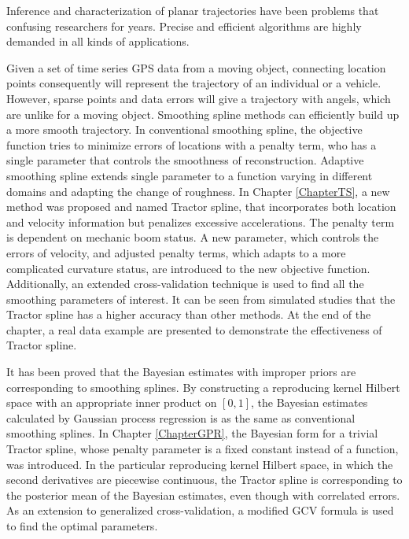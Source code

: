 
Inference and characterization of planar trajectories have been problems that confusing researchers for years. Precise and efficient algorithms are highly demanded in all kinds of applications. 

Given a set of time series GPS data from a moving object, connecting location points consequently will represent the trajectory of an individual or a vehicle. However, sparse points and data errors will give a trajectory with angels, which are unlike for a moving object. Smoothing spline methods can efficiently build up a more smooth trajectory. In conventional smoothing spline, the objective function tries to minimize errors of locations with a penalty term, who has a single parameter that controls the smoothness of reconstruction. Adaptive smoothing spline extends single parameter to a function varying in different domains and adapting the change of roughness. In Chapter \ref{ChapterTS}, a new method was proposed and named Tractor spline, that incorporates both location and velocity information but penalizes excessive accelerations. The penalty term is dependent on mechanic boom status. A new parameter, which controls the errors of velocity, and adjusted penalty terms, which adapts to a more complicated curvature status, are introduced to the new objective function. Additionally, an extended cross-validation technique is used to find all the smoothing parameters of interest. It can be seen from simulated studies that the Tractor spline has a higher accuracy than other methods. At the end of the chapter, a real data example are presented to demonstrate the effectiveness of Tractor spline.


It has been proved that the Bayesian estimates with improper priors are corresponding to smoothing splines. By constructing a reproducing kernel Hilbert space with an appropriate inner product on $[0,1]$, the Bayesian estimates calculated by Gaussian process regression is as the same as conventional smoothing splines. In Chapter \ref{ChapterGPR}, the Bayesian form for a trivial Tractor spline, whose penalty parameter is a fixed constant instead of a function, was introduced. In the particular reproducing kernel Hilbert space, in which the second derivatives are piecewise continuous, the Tractor spline is corresponding to the posterior mean of the Bayesian estimates, even though with correlated errors. As an extension to generalized cross-validation, a modified GCV formula is used to find the optimal parameters. 



